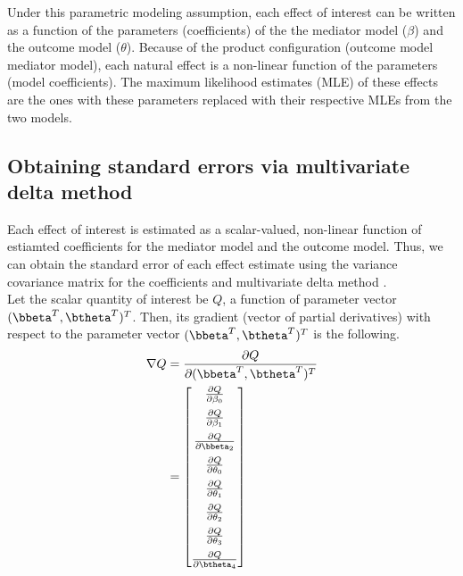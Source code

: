 \documentclass[dvipdfmx,10pt]{article}
\begin{document}
Under this parametric modeling assumption, each effect of interest can be written as a function of the parameters (coefficients) of the the mediator model (\(\beta\)) and the outcome model (\(\theta\)). Because of the product configuration (outcome model \texttimes{} mediator model), each natural effect is a non-linear function of the parameters (model coefficients). The maximum likelihood estimates (MLE) of these effects are the ones with these parameters replaced with their respective MLEs from the two models.

\subsection{Obtaining standard errors via multivariate delta method}
\label{sec:org7f00a05}

Each effect of interest is estimated as a scalar-valued, non-linear function of estiamted coefficients for the mediator model and the outcome model. Thus, we can obtain the standard error of each effect estimate using the variance covariance matrix for the coefficients and multivariate delta method \cite{hoefWhoInventedDelta2012}.\\

Let the scalar quantity of interest be \(Q\), a function of parameter vector \((\bbeta^{T},\btheta^{T})^{T}\). Then, its gradient (vector of partial derivatives) with respect to the parameter vector \((\bbeta^{T},\btheta^{T})^{T}\) is the following.\\

\begin{align*}
\nabla Q &= \frac{\partial Q}{\partial (\bbeta^{T},\btheta^{T})^{T}}\\
         &= \begin{bmatrix}
           \frac{\partial Q}{\partial \beta_{0}}\\[6pt]
           \frac{\partial Q}{\partial \beta_{1}}\\[6pt]
           \frac{\partial Q}{\partial \bbeta_{2}}\\[6pt]
           \frac{\partial Q}{\partial \theta_{0}}\\[6pt]
           \frac{\partial Q}{\partial \theta_{1}}\\[6pt]
           \frac{\partial Q}{\partial \theta_{2}}\\[6pt]
           \frac{\partial Q}{\partial \theta_{3}}\\[6pt]
           \frac{\partial Q}{\partial \btheta_{4}}\\
         \end{bmatrix}\\
\end{align*}
\end{document}
